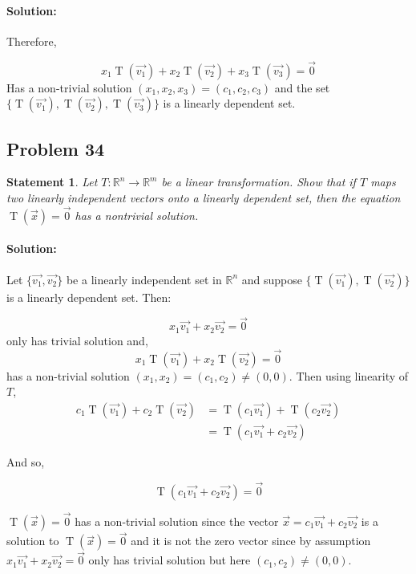 \documentclass[12pt, letterpaper]{article}
\newcommand{\R}{\mathbb{R}}
\theoremstyle{statement}
\theoremstyle{statement}
\newtheorem*{atmStat}{Statement}
\newenvironment{Solution}{\noindent\ignorespaces\paragraph{Solution:}}{\hfill \ding{122}\par\noindent}
\begin{document}
\begin{Solution}
        Therefore,  
        
        $$x_1\operatorname{T}(\Vec{v_1})
        + x_2\operatorname{T}(\Vec{v_2})
        + x_3\operatorname{T}(\Vec{v_3})
        = \Vec{0}$$
        Has a non-trivial solution $(x_1, x_2, x_3) = (c_1, c_2, c_3)$ and the set $\{ \operatorname{T}(\Vec{v_1}), \operatorname{T}(\Vec{v_2}), \operatorname{T}(\Vec{v_3})\}$ is a linearly dependent set.
        
        \end{Solution}
        
        \subsection*{Problem 34}
        \begin{atmStat}
        Let $T: \R^n \longrightarrow \R^m$ be a linear transformation. Show that if $T$ maps two linearly independent vectors onto a linearly dependent set, then the equation $\operatorname{T}(\Vec{x})=\Vec{0}$ has a nontrivial solution. 
        \end{atmStat}
        \begin{Solution}
        Let $\{\Vec{v_1}, \Vec{v_2}\}$ be a linearly independent set in $\R^n$ and suppose $\{ \operatorname{T}(\Vec{v_1}), \operatorname{T}(\Vec{v_2})\}$ is a linearly dependent set. Then: 
        
        $$x_1\Vec{v_1} + x_2\Vec{v_2} = \Vec{0}$$ 
        only has trivial solution and,
        $$x_1 \operatorname{T}(\Vec{v_1})
        + x_2 \operatorname{T}(\Vec{v_2})
        = \Vec{0}$$
        has a non-trivial solution $(x_1, x_2) = (c_1, c_2) \neq (0, 0)$. Then using linearity of $T$, 
        \begin{align*}
            c_1 \operatorname{T}(\Vec{v_1})
            + c_2 \operatorname{T}(\Vec{v_2})
            & = \operatorname{T}(c_1\Vec{v_1}) 
            + \operatorname{T}(c_2\Vec{v_2}) \\
            & = \operatorname{T}(c_1\Vec{v_1} + c_2\Vec{v_2})
        \end{align*}
        
        And so, 
        
        $$
        \operatorname{T}(c_1\Vec{v_1} + c_2\Vec{v_2})
        = \Vec{0}
        $$
        
        $\operatorname{T}(\Vec{x})=\Vec{0}$ has a non-trivial solution since the vector $\Vec{x} = c_1\Vec{v_1} + c_2\Vec{v_2}$ is a solution to $\operatorname{T}(\Vec{x})=\Vec{0}$ and it is not the zero vector since by assumption $x_1\Vec{v_1} + x_2\Vec{v_2}=\Vec{0}$ only has trivial solution but here $(c_1, c_2) \neq (0, 0)$.
        
        \end{Solution}
        
\end{document}
